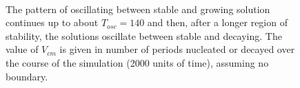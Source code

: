 \documentclass[pre,preprint,superscriptaddress]{revtex4-1}
\begin{document}
  \begin{figure}[h!]
  \begin{center}
    \mbox{	
	\quad 
      } \mbox{
	\quad 
      }
    \caption{The pattern of oscillating between stable and growing solution continues up to about $T_{osc}=140$ and then, after a longer region of stability, the solutions oscillate between stable and decaying. The value of $V_{cm}$ is given in number of periods nucleated or decayed over the course of the simulation (2000 units of time), assuming no boundary.}
    \label{fig:r28slice3}
  \end{center}
\end{figure} 
\end{document}
